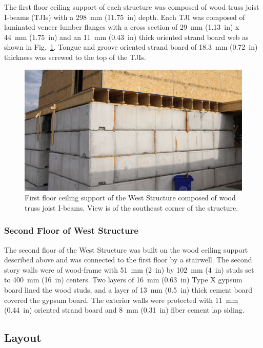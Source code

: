 \documentclass[12pt,oneside]{book}
\begin{document}
The first floor ceiling support of each structure was composed of wood truss joist I-beams (TJIs) with a 298~mm (11.75~in) depth. Each TJI was composed of laminated veneer lumber flanges with a cross section of 29~mm (1.13~in) x 44~mm (1.75~in) and an 11~mm (0.43~in) thick oriented strand board web as shown in Fig.~\ref{fig:TJI}. Tongue and groove oriented strand board of 18.3~mm (0.72~in) thickness was screwed to the top of the TJIs.

\begin{figure}[!ht]
	\includegraphics[width=6in]{../../Hose_Stream_Tests/Figures/Pictures/TJI_support}
	\caption[Ceiling support of the West Structure.]{First floor ceiling support of the West Structure composed of wood truss joist I-beams. View is of the southeast corner of the structure.}
	\label{fig:TJI}
\end{figure}
\FloatBarrier

\subsubsection{Second Floor of West Structure}
The second floor of the West Structure was built on the wood ceiling support described above and was connected to the first floor by a stairwell. The second story walls were of wood-frame with 51~mm (2~in) by 102~mm (4~in) studs set to 400~mm (16~in) centers. Two layers of 16~mm (0.63~in) Type X gypsum board lined the wood studs, and a layer of 13~mm (0.5~in) thick cement board covered the gypsum board. The exterior walls were protected with 11~mm (0.44~in) oriented strand board and 8~mm (0.31~in) fiber cement lap siding.

\subsection{Layout}
\label{sec:layout}
\end{document}
